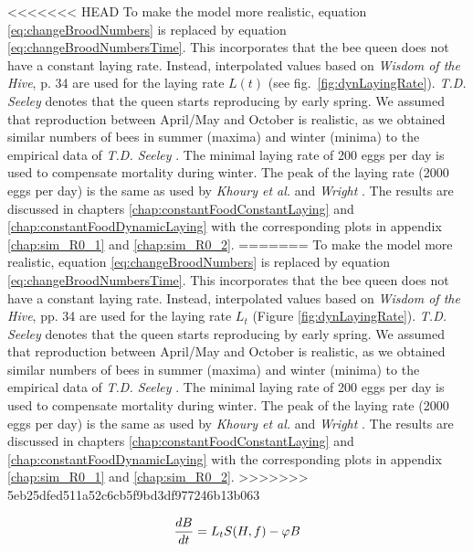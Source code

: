 <<<<<<< HEAD
		To make the model more realistic, equation \ref{eq:changeBroodNumbers} is replaced by equation \ref{eq:changeBroodNumbersTime}. This incorporates that the bee queen does not have a constant laying rate. Instead, interpolated values based on \textit{Wisdom of the Hive}, p. 34 \cite{seeley95} are used for the laying rate $L(t)$ (see fig.~\ref{fig:dynLayingRate}). \textit{T.D. Seeley} denotes that the queen starts reproducing by early spring. We assumed that reproduction between April/May and October is realistic, as we obtained similar numbers of bees in summer (maxima) and winter (minima) to the empirical data of \textit{T.D. Seeley} \cite{seeley95}. The minimal laying rate of 200 eggs per day is used to compensate mortality during winter. The peak of the laying rate (2000 eggs per day) is the same as used by \textit{Khoury et al.} \cite{khoury13} and \textit{Wright} \cite{wright08}. The results are discussed in chapters \ref{chap:constantFoodConstantLaying} and \ref{chap:constantFoodDynamicLaying} with the corresponding plots in appendix \ref{chap:sim_R0_1} and \ref{chap:sim_R0_2}.
=======
		To make the model more realistic, equation \ref{eq:changeBroodNumbers} is replaced by equation \ref{eq:changeBroodNumbersTime}. This incorporates that the bee queen does not have a constant laying rate. Instead, interpolated values based on \textit{Wisdom of the Hive}, pp. 34 \cite{seeley95} are used for the laying rate $L_t$ (Figure \ref{fig:dynLayingRate}). \textit{T.D. Seeley} denotes that the queen starts reproducing by early spring. We assumed that reproduction between April/May and October is realistic, as we obtained similar numbers of bees in summer (maxima) and winter (minima) to the empirical data of \textit{T.D. Seeley} \cite{seeley95}. The minimal laying rate of 200 eggs per day is used to compensate mortality during winter. The peak of the laying rate (2000 eggs per day) is the same as used by \textit{Khoury et al.} \cite{khoury13} and \textit{Wright} \cite{wright08}. The results are discussed in chapters \ref{chap:constantFoodConstantLaying} and \ref{chap:constantFoodDynamicLaying} with the corresponding plots in appendix \ref{chap:sim_R0_1} and \ref{chap:sim_R0_2}.
>>>>>>> 5eb25dfed511a52c6cb5f9bd3df977246b13b063
		
		\begin{equation}\label{eq:changeBroodNumbersTime}
			{dB \over dt} = L_tS(H,f)-\phi B
		\end{equation}
		
